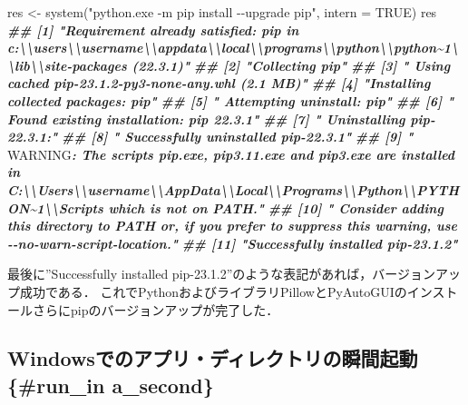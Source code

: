 \documentclass[
]{article}
\newenvironment{Shaded}{\begin{snugshade}}{\end{snugshade}}
\newcommand{\AlertTok}[1]{\textcolor[rgb]{0.94,0.16,0.16}{#1}}
\newcommand{\AttributeTok}[1]{\textcolor[rgb]{0.77,0.63,0.00}{#1}}
\newcommand{\ConstantTok}[1]{\textcolor[rgb]{0.00,0.00,0.00}{#1}}
\newcommand{\DocumentationTok}[1]{\textcolor[rgb]{0.56,0.35,0.01}{\textbf{\textit{#1}}}}
\newcommand{\FunctionTok}[1]{\textcolor[rgb]{0.00,0.00,0.00}{#1}}
\newcommand{\NormalTok}[1]{#1}
\newcommand{\OtherTok}[1]{\textcolor[rgb]{0.56,0.35,0.01}{#1}}
\newcommand{\StringTok}[1]{\textcolor[rgb]{0.31,0.60,0.02}{#1}}
\begin{document}
\begin{Shaded}
\begin{Highlighting}[]
\NormalTok{res }\OtherTok{\textless{}{-}} \FunctionTok{system}\NormalTok{(}\StringTok{"python.exe {-}m pip install {-}{-}upgrade pip"}\NormalTok{, }\AttributeTok{intern =} \ConstantTok{TRUE}\NormalTok{)}
\NormalTok{res}
\DocumentationTok{\#\#  [1] "Requirement already satisfied: pip in c:\textbackslash{}\textbackslash{}users\textbackslash{}\textbackslash{}username\textbackslash{}\textbackslash{}appdata\textbackslash{}\textbackslash{}local\textbackslash{}\textbackslash{}programs\textbackslash{}\textbackslash{}python\textbackslash{}\textbackslash{}python\textasciitilde{}1\textbackslash{}\textbackslash{}lib\textbackslash{}\textbackslash{}site{-}packages (22.3.1)"}
\DocumentationTok{\#\#  [2] "Collecting pip"}
\DocumentationTok{\#\#  [3] "  Using cached pip{-}23.1.2{-}py3{-}none{-}any.whl (2.1 MB)"}
\DocumentationTok{\#\#  [4] "Installing collected packages: pip"}
\DocumentationTok{\#\#  [5] "  Attempting uninstall: pip"}
\DocumentationTok{\#\#  [6] "    Found existing installation: pip 22.3.1"}
\DocumentationTok{\#\#  [7] "    Uninstalling pip{-}22.3.1:"}
\DocumentationTok{\#\#  [8] "      Successfully uninstalled pip{-}22.3.1"}
\DocumentationTok{\#\#  [9] "  }\AlertTok{WARNING}\DocumentationTok{: The scripts pip.exe, pip3.11.exe and pip3.exe are installed in \textquotesingle{}C:\textbackslash{}\textbackslash{}Users\textbackslash{}\textbackslash{}username\textbackslash{}\textbackslash{}AppData\textbackslash{}\textbackslash{}Local\textbackslash{}\textbackslash{}Programs\textbackslash{}\textbackslash{}Python\textbackslash{}\textbackslash{}PYTHON\textasciitilde{}1\textbackslash{}\textbackslash{}Scripts\textquotesingle{} which is not on PATH."}
\DocumentationTok{\#\# [10] "  Consider adding this directory to PATH or, if you prefer to suppress this warning, use {-}{-}no{-}warn{-}script{-}location."}
\DocumentationTok{\#\# [11] "Successfully installed pip{-}23.1.2"}
\end{Highlighting}
\end{Shaded}

最後に''Successfully installed pip-23.1.2''のような表記があれば，バージョンアップ成功である．
これでPythonおよびライブラリPillowとPyAutoGUIのインストールさらにpipのバージョンアップが完了した．

\hypertarget{windowsux3067ux306eux30a2ux30d7ux30eaux30c7ux30a3ux30ecux30afux30c8ux30eaux306eux77acux9593ux8d77ux52d5-run_in-a_second}{%
\subsection{Windowsでのアプリ・ディレクトリの瞬間起動 \{\#run\_in a\_second\}}\label{windowsux3067ux306eux30a2ux30d7ux30eaux30c7ux30a3ux30ecux30afux30c8ux30eaux306eux77acux9593ux8d77ux52d5-run_in-a_second}}
\end{document}
